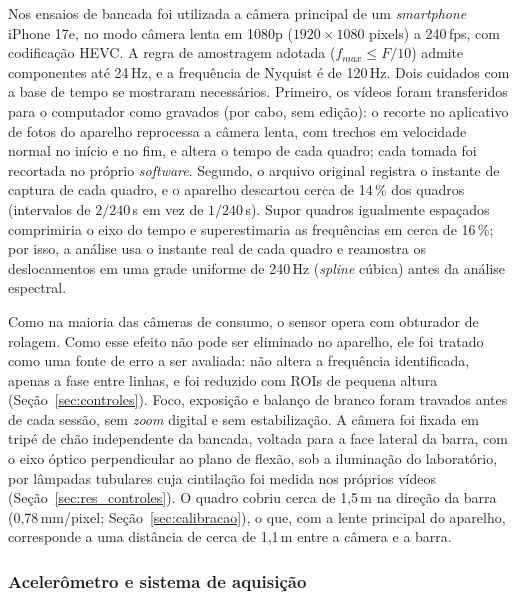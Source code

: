 \documentclass[a4paper,10pt,twocolumn]{article}
\begin{document}
Nos ensaios de bancada foi utilizada a câmera principal de um \textit{smartphone} iPhone 17e, no modo câmera lenta em 1080p ($1920 \times 1080$ pixels) a 240\,fps, com codificação HEVC. A regra de amostragem adotada ($f_{max} \leq F/10$) admite componentes até 24\,Hz, e a frequência de Nyquist é de 120\,Hz. Dois cuidados com a base de tempo se mostraram necessários. Primeiro, os vídeos foram transferidos para o computador como gravados (por cabo, sem edição): o recorte no aplicativo de fotos do aparelho reprocessa a câmera lenta, com trechos em velocidade normal no início e no fim, e altera o tempo de cada quadro; cada tomada foi recortada no próprio \textit{software}. Segundo, o arquivo original registra o instante de captura de cada quadro, e o aparelho descartou cerca de 14\,\% dos quadros (intervalos de $2/240$\,s em vez de $1/240$\,s). Supor quadros igualmente espaçados comprimiria o eixo do tempo e superestimaria as frequências em cerca de 16\,\%; por isso, a análise usa o instante real de cada quadro e reamostra os deslocamentos em uma grade uniforme de 240\,Hz (\textit{spline} cúbica) antes da análise espectral.

Como na maioria das câmeras de consumo, o sensor opera com obturador de rolagem. Como esse efeito não pode ser eliminado no aparelho, ele foi tratado como uma fonte de erro a ser avaliada: não altera a frequência identificada, apenas a fase entre linhas, e foi reduzido com ROIs de pequena altura (Seção~\ref{sec:controles}). Foco, exposição e balanço de branco foram travados antes de cada sessão, sem \textit{zoom} digital e sem estabilização. A câmera foi fixada em tripé de chão independente da bancada, voltada para a face lateral da barra, com o eixo óptico perpendicular ao plano de flexão, sob a iluminação do laboratório, por lâmpadas tubulares cuja cintilação foi medida nos próprios vídeos (Seção~\ref{sec:res_controles}). O quadro cobriu cerca de 1,5\,m na direção da barra (0,78\,mm/pixel; Seção~\ref{sec:calibracao}), o que, com a lente principal do aparelho, corresponde a uma distância de cerca de 1,1\,m entre a câmera e a barra. %

\subsubsection{Acelerômetro e sistema de aquisição}
\label{sec:acelerometro}
\end{document}
